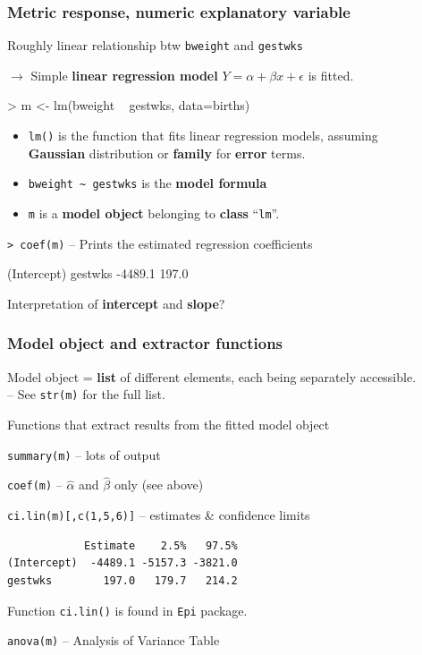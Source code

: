 \documentclass[12pt,dvipsnames,t,handout%
,aspectratio=169%
]{beamer}
\begin{document}
\begin{frame}[fragile]\frametitle{Metric response, numeric explanatory variable}

Roughly linear relationship btw \texttt{bweight}
and \texttt{gestwks} 

$\to$ 
 Simple {\bf linear regression model} $Y = \alpha + \beta x + \epsilon$ is fitted.
\begin{semiverbatim}
> m <- lm(bweight ~ gestwks, data=births)
\end{semiverbatim}
\begin{itemize}
\item \texttt{lm()} is the function that fits linear regression models,
assuming \\ {\bf Gaussian} distribution or \textbf{family} for {\bf error} terms.
\medskip
\item \verb+bweight ~ gestwks+ is the {\bf model formula}
\medskip
\item \texttt{m} is a {\bf model object} belonging to {\bf class} ``{\tt lm}''.
\end{itemize}

\medskip

\verb|> coef(m)| -- Prints the estimated regression coefficients
{\small
\begin{semiverbatim}
(Intercept)     gestwks 
    -4489.1       197.0 
\end{semiverbatim}
}
Interpretation of {\bf intercept} and {\bf slope}?
\vfill
\end{frame}


\begin{frame}[fragile]\frametitle{Model object and extractor functions}

Model object = {\bf list} of different elements, each being
separately accessible. \\ -- See \texttt{str(m)} for the full list.

\medskip
Functions that extract results from the fitted model object

\bi
\item
 \verb|summary(m)| -- lots of output
\medskip
\item
\verb|coef(m)| -- $\widehat\alpha$ and $\widehat\beta$ only (see above)
\medskip
\item
\verb|ci.lin(m)[,c(1,5,6)]| -- estimates \& confidence limits 
{\small
\begin{verbatim}
            Estimate    2.5%   97.5%
(Intercept)  -4489.1 -5157.3 -3821.0
gestwks        197.0   179.7   214.2
\end{verbatim}
}
Function \texttt{ci.lin()} is found in {\tt Epi} package.
\medskip
\item
\verb|anova(m)| -- Analysis of Variance Table

\ei
\end{frame}
\end{document}
